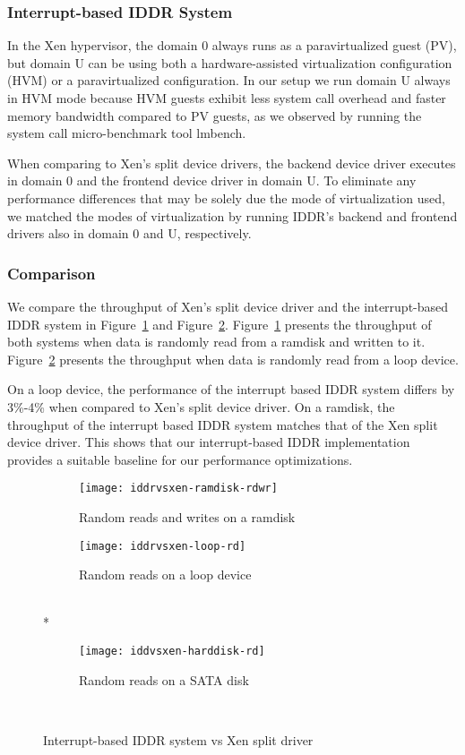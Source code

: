 \subsubsection*{Interrupt-based IDDR System}
In the Xen hypervisor, the domain 0 always runs as a paravirtualized guest (PV),
but domain U can be using both a hardware-assisted virtualization configuration (HVM) 
or a paravirtualized configuration.  In our setup we run domain U always
in HVM mode because HVM guests exhibit less system call overhead
and faster memory bandwidth compared to PV guests, as we observed
by running the system call micro-benchmark tool lmbench\cite{lmbench}. 

When comparing to Xen's split device drivers, the backend device driver executes
in domain 0 and the frontend device driver in domain U.  
To eliminate any performance differences that may be solely due the mode
of virtualization used, we matched the modes of virtualization
by running IDDR's backend and frontend drivers also in 
domain 0 and U, respectively.

\subsubsection*{Comparison}
We compare the throughput of Xen's split device driver and the
interrupt-based IDDR system in Figure~\ref{fig:iddrvsxen-ramdisk-rdwr}
and Figure~\ref{fig:iddrvsxen-loop-rd}. 
Figure~\ref{fig:iddrvsxen-ramdisk-rdwr} presents the
throughput of both systems when data is randomly read from a ramdisk and
written to it. Figure~\ref{fig:iddrvsxen-loop-rd} presents the throughput
when data is randomly read from a loop device.

On a loop device, the performance of the interrupt based IDDR system
differs by 3\%-4\% when compared to Xen's split device driver. On a
ramdisk, the throughput of the interrupt based IDDR system matches that
of the Xen split device driver. This shows that our interrupt-based
IDDR implementation provides a suitable baseline for our performance 
optimizations.

\begin{figure}[!ht]
  \begin{subfigure}[b]{0.2\textwidth}
  \texttt{[image: iddrvsxen-ramdisk-rdwr]}
  \caption{Random reads and writes on a ramdisk}
  \label{fig:iddrvsxen-ramdisk-rdwr}
  \end{subfigure}
  \hspace{50mm}
  \begin{subfigure}[b]{0.2\textwidth}
  \texttt{[image: iddrvsxen-loop-rd]}
  \caption{Random reads on a loop device}
  \label{fig:iddrvsxen-loop-rd}
  \end{subfigure}\\*
  \hspace{150mm}
  \begin{subfigure}[b]{0.2\textwidth}
  \texttt{[image: iddvsxen-harddisk-rd]}
  \caption{Random reads on a SATA disk}
  \label{fig:iddrvsxen-harddisk-rd}
  \end{subfigure}\\
\caption{Interrupt-based IDDR system vs Xen split driver}\label{fig:seqloopdisk}
\end{figure}

